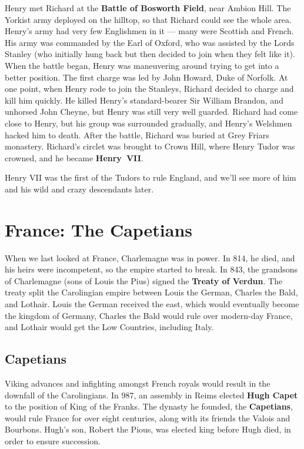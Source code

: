 Henry met Richard at the \textbf{Battle of Bosworth Field}, near Ambion Hill.
The Yorkist army deployed on the hilltop, so that Richard could see the whole area.
Henry's army had very few Englishmen in it --- many were Scottish and French.
His army was commanded by the Earl of Oxford, who was assisted by the Lords Stanley
(who initially hung back but then decided to join when they felt like it).
When the battle began, Henry was maneuvering around trying to get into a better position.
The first charge was led by John Howard, Duke of Norfolk.
At one point, when Henry rode to join the Stanleys, Richard decided to charge and kill him quickly.
He killed Henry's standard-bearer Sir William Brandon, and unhorsed John Cheyne,
but Henry was still very well guarded.
Richard had come close to Henry, but his group was surrounded gradually,
and Henry's Welshmen hacked him to death.
After the battle, Richard was buried at Grey Friars monastery.
Richard's circlet was brought to Crown Hill,
where Henry Tudor was crowned, and he became \textbf{Henry~VII}\@.

Henry VII was the first of the Tudors to rule England,
and we'll see more of him and his wild and crazy descendants later.

\section{France: The Capetians}

When we last looked at France, Charlemagne was in power.
In 814, he died, and his heirs were incompetent, so the empire started to break.
In 843, the grandsons of Charlemagne (sons of Louis the Pius) signed the \textbf{Treaty of Verdun}.
The treaty split the Carolingian empire between Louis the German, Charles the Bald, and Lothair.
Louis the German received the east, which would eventually become the kingdom of Germany,
Charles the Bald would rule over modern-day France,
and Lothair would get the Low Countries, including Italy.

\subsection*{Capetians}

Viking advances and infighting amongst French royals would result in the downfall of the Carolingians.
In 987, an assembly in Reims elected \textbf{Hugh Capet} to the position of King of the Franks.
The dynasty he founded, the \textbf{Capetians}, would rule France for over eight centuries,
along with its friends the Valois and Bourbons.
Hugh's son, Robert the Pious, was elected king before Hugh died, in order to ensure succession.

